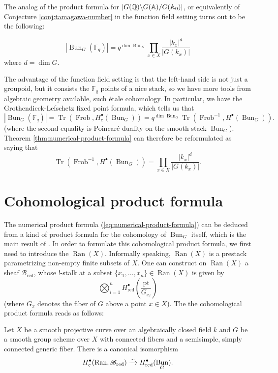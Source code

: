 \documentclass[oneside]{amsart}
\renewcommand{\A}{\mathbb{A}}
\newcommand{\Bred}{\mathcal{B}_\text{red}}
\newcommand{\F}{\mathbb{F}}
\DeclareMathOperator{\Bun}{Bun}
\DeclareMathOperator{\Tr}{Tr}
\DeclareMathOperator{\Frob}{Frob}
\DeclareMathOperator{\Ran}{Ran}
\newcommand{\red}{_{\mathrm{red}}}
\begin{document}
The analog of the product formula for $\left| G(\Q)\backslash G(\A) /G(\A_0) \right|$, or equivalently of Conjecture \ref{conj:tamagawa-number} in the function field setting turns out to be the following:

\begin{theorem} \label{thm:numerical-product-formula}
	\[
	\left| \Bun_G(\F_q) \right| = q^{\dim\Bun_G}\prod_{x\in X} \frac{|k_x|^{d}}{|G(k_x)|}
	\] 
	where $d=\dim G$.
\end{theorem}
The advantage of the function field setting is that the left-hand side is not just a groupoid, but it consists the $\F_q$ points of a nice stack, so we have more tools from algebraic geometry available, such \'etale cohomology. In particular, we have the Grothendieck-Lefschetz fixed point formula, which tells us that
\[
\left| \Bun_G(\F_q) \right| = \Tr(\Frob, H_c^{\bullet}(\Bun_G)) = q^{\dim \Bun_G}\Tr(\Frob^{-1}, H^{\bullet}(\Bun_G)).	
\] 
(where the second equality is Poincaré duality on the smooth stack $\Bun_G$). Theorem \ref{thm:numerical-product-formula} can therefore be reformulated as saying that 
\begin{equation} \label{eq:numerical-product-formula}
    \Tr(\Frob^{-1}, H^{\bullet}(\Bun_G)) = \prod_{x\in X} \frac{|k_x|^{d}}{|G(k_x)|}.
\end{equation}

\section{Cohomological product formula}

The numerical product formula (\ref{eq:numerical-product-formula}) can be deduced from a kind of product formula for the cohomology of $\Bun_G$ itself, which is the main result of \cite{abott}. In order to formulate this cohomological product formula, we first need to introduce the  $\Ran(X)$. Informally speaking, $\Ran(X)$ is a prestack parametrizing non-empty finite subsets of $X$. One can construct on $\Ran(X)$ a sheaf $\Bred$, whose $!$-stalk at a subset $\{x_1,\dots,x_n\} \in \Ran(X)$ is given by
\[
\bigotimes_{i=1}^{n} H\red^{\bullet}\left( \frac{\text{pt}}{G_{x_i}} \right)
\] 
(where $G_x$ denotes the fiber of $G$ above a point $x\in X$).
The the cohomological product formula reads as follows:

\begin{theorem} \label{thm:coh-product-formula}
    Let $X$ be a smooth projective curve over an algebraically closed field $k$ and $G$ be a smooth group scheme over $X$ with connected fibers and a semisimple, simply connected generic fiber. There is a canonical isomorphism
    \[H_c^{\bullet}(\Ran,\Bred) \simto H\red^{\bullet}(\Bun_G).\]
\end{theorem}
\end{document}
